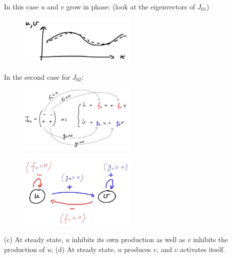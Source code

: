 \begin{enumerate}
    In this case $u$ and $v$ grow in phase: (look at the eigenvectors of
    $J_{01}$)
    \begin{figure}[H]
      \centering
      \includegraphics[width=0.5\textwidth]{graphics/2025_10_17_3cf351a4349ae3691080g-12(1)}
    \end{figure}
    In the second case for $J_{02}$:
    \begin{figure}[H]
      \centering
      \includegraphics[width=0.5\textwidth]{graphics/2025_10_17_3cf351a4349ae3691080g-12(3)}
    \end{figure}
    \begin{figure}[H]
      \centering
      \includegraphics[width=0.5\textwidth]{graphics/2025_10_17_3cf351a4349ae3691080g-12(2)}
    \end{figure}
    (c) At steady state, $u$ inhibits its own production as well as $v$ inhibits
    the production of $u$;
    (d) At steady state, $u$ produces $v$, and $v$ activates itself.


\end{enumerate}

